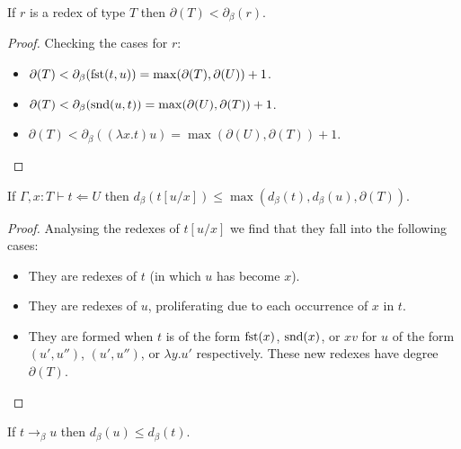 \begin{lemma}\label{beta_redex_ineq}
    If $r$ is a redex of type $T$ then $\partial(T) < \partial_{\beta}(r)$. 
\end{lemma}

\begin{proof}
    Checking the cases for $r$:
    \begin{itemize}
        \item $\partial (T) < \partial_{\beta}(\mathrm{fst}(t, u)) = \max(\partial(T), \partial(U)) + 1$.
        \item $\partial (T) < \partial_{\beta}(\mathrm{snd}(u, t)) = \max(\partial(U), \partial(T)) + 1$.
        \item $\partial (T) < \partial_{\beta}((\lambda x . t)u) = \max(\partial(U), \partial(T)) + 1$.
    \end{itemize}
\end{proof}

\begin{lemma}\label{beta_sub_ineq}
    If $\Gamma , x : T \vdash t \Leftarrow U$ then $d_{\beta}(t[u/x]) \leq \max(d_{\beta}(t), d_{\beta}(u), \partial(T))$.
\end{lemma}

\begin{proof}
    Analysing the redexes of $t[u/x]$ we find that they fall into the following cases:
    \begin{itemize}
        \item They are redexes of $t$ (in which $u$ has become $x$).
        \item They are redexes of $u$, proliferating due to each occurrence of $x$ in $t$.
        \item They are formed when $t$ is of the form $\mathrm{fst}(x)$, $\mathrm{snd}(x)$, or $x v$ for $u$ of the form $(u', u'')$, $(u', u'')$, or $\lambda y . u'$ respectively. These new redexes have degree $\partial(T)$.
    \end{itemize}
\end{proof}

\begin{lemma}\label{beta_reduct_ineq}
    If $t \to_{\beta} u$ then $d_{\beta}(u) \le d_{\beta}(t)$.    
\end{lemma}

